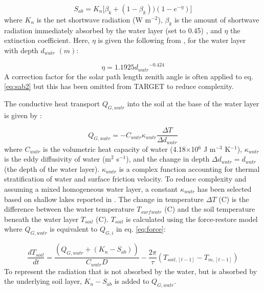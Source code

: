 \documentclass[gmd, manuscript]{copernicus}
\begin{document}
\begin{equation} 
\ensuremath{S_{ab}} = \ensuremath{K_{n}} \big[ \ensuremath{\beta_{k}} + (1 - \ensuremath{\beta_{k}}) )(1-e^{-\ensuremath{\eta}})  \big]
\label{eq:sab2} \end{equation} where \ensuremath{K_{n}} is the net shortwave radiation (W m$^{-2}$), \ensuremath{\beta_{k}} is the amount of shortwave radiation immediately absorbed by the water layer (set to 0.45) \citep{MolinaMartinez2006}, and \ensuremath{\eta} the extinction coefficient. Here, \ensuremath{\eta} is given the following from \cite{Subin2012a}, for the water layer with depth \ensuremath{d_{watr}} $(m)$:

\begin{equation} 
\ensuremath{\eta} = 1.1925 \ensuremath{d_{watr}}^{-0.424}
\label{eq:eta} \end{equation} A correction factor for the solar path length zenith angle is often applied to eq. \ref{eq:sab2} \citep{MolinaMartinez2006} but this has been omitted from TARGET to reduce complexity. 

The conductive heat transport \ensuremath{Q_{G,watr}} into the soil at the base of the water layer is given by \cite{MolinaMartinez2006}:

\begin{equation} 
\ensuremath{Q_{G,watr}} = - \ensuremath{C_{watr}} \ensuremath{\kappa_{watr}} \frac{\Delta T}{\Delta \ensuremath{d_{watr}}}
\label{eq:gwatr} \end{equation} where \ensuremath{C_{watr}} is the volumetric heat capacity of water (4.18$\times$10$^{6}$ J m$^{-3}$ K$^{-1}$), \ensuremath{\kappa_{watr}} is the eddy diffusivity of water (m$^{2}$ s$^{-1}$), 
and the change in depth $\Delta \ensuremath{d_{watr}} = \ensuremath{d_{watr}}$ (the depth of the water layer). \ensuremath{\kappa_{watr}} is a complex function accounting for thermal stratification of water and surface friction velocity. To reduce complexity and assuming a mixed homogeneous water layer, a constant \ensuremath{\kappa_{watr}} has been selected based on shallow lakes reported in \cite{SalasDeLeon2016}. The change in temperature $\Delta T$ (\degree C) is the difference between the water temperature $T_{surf}$$_{watr}$ (\degree C) and the soil temperature beneath the water layer \ensuremath{T_{soil}} (\degree C). \ensuremath{T_{soil}} is calculated using the force-restore model where \ensuremath{Q_{G,watr}} is equivalent to \ensuremath{Q_{G,i}} in eq. \ref{eq:force}:

\begin{equation}
\frac{d \ensuremath{T_{soil}}}{d t}= \frac{(\ensuremath{Q_{G,watr}} + (\ensuremath{K_{n}} - \ensuremath{S_{ab}}))}{C_{watr} D} - \frac{2 \pi}{\tau} (T_{soil,[t-1]} - T_{m,[t-1]})
\end{equation} To represent the radiation that is not absorbed by the water, but is absorbed by the underlying soil layer, $\ensuremath{K_{n}} - \ensuremath{S_{ab}}$ is added to \ensuremath{Q_{G,watr}}.
\end{document}
